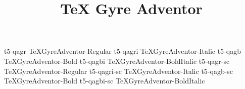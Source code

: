 \documentclass[test]{vnsample}
\title{TeX Gyre Adventor}
\begin{document}
\begin{shortsample}
    {t5-qagr}     {TeXGyreAdventor-Regular}
   {t5-qagri}    {TeXGyreAdventor-Italic}
    {t5-qagb}     {TeXGyreAdventor-Bold}
   {t5-qagbi}    {TeXGyreAdventor-BoldItalic}
   {t5-qagr-sc}  {TeXGyreAdventor-Regular}
 {t5-qagri-sc} {TeXGyreAdventor-Italic}
   {t5-qagb-sc}  {TeXGyreAdventor-Bold}
 {t5-qagbi-sc} {TeXGyreAdventor-BoldItalic}
\end{shortsample}
\end{document}
